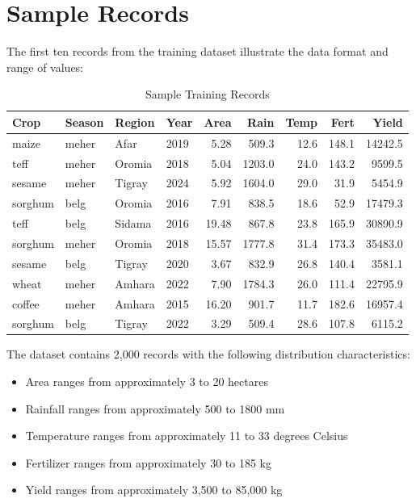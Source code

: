 \section{Sample Records}

The first ten records from the training dataset illustrate the data format and range of values:

\begin{table}[H]
\centering
\caption{Sample Training Records}
\label{tab:sample-records}
\begin{tabular}{llllrrrrr}
\toprule
\textbf{Crop} & \textbf{Season} & \textbf{Region} & \textbf{Year} & \textbf{Area} & \textbf{Rain} & \textbf{Temp} & \textbf{Fert} & \textbf{Yield} \\
\midrule
maize & meher & Afar & 2019 & 5.28 & 509.3 & 12.6 & 148.1 & 14242.5 \\
teff & meher & Oromia & 2018 & 5.04 & 1203.0 & 24.0 & 143.2 & 9599.5 \\
sesame & meher & Tigray & 2024 & 5.92 & 1604.0 & 29.0 & 31.9 & 5454.9 \\
sorghum & belg & Oromia & 2016 & 7.91 & 838.5 & 18.6 & 52.9 & 17479.3 \\
teff & belg & Sidama & 2016 & 19.48 & 867.8 & 23.8 & 165.9 & 30890.9 \\
sorghum & meher & Oromia & 2018 & 15.57 & 1777.8 & 31.4 & 173.3 & 35483.0 \\
sesame & belg & Tigray & 2020 & 3.67 & 832.9 & 26.8 & 140.4 & 3581.1 \\
wheat & meher & Amhara & 2022 & 7.90 & 1784.3 & 26.0 & 111.4 & 22795.9 \\
coffee & meher & Amhara & 2015 & 16.20 & 901.7 & 11.7 & 182.6 & 16957.4 \\
sorghum & belg & Tigray & 2022 & 3.29 & 509.4 & 28.6 & 107.8 & 6115.2 \\
\bottomrule
\end{tabular}
\end{table}

The dataset contains 2,000 records with the following distribution characteristics:
\begin{itemize}
  \item Area ranges from approximately 3 to 20 hectares
  \item Rainfall ranges from approximately 500 to 1800 mm
  \item Temperature ranges from approximately 11 to 33 degrees Celsius
  \item Fertilizer ranges from approximately 30 to 185 kg
  \item Yield ranges from approximately 3,500 to 85,000 kg
\end{itemize}

